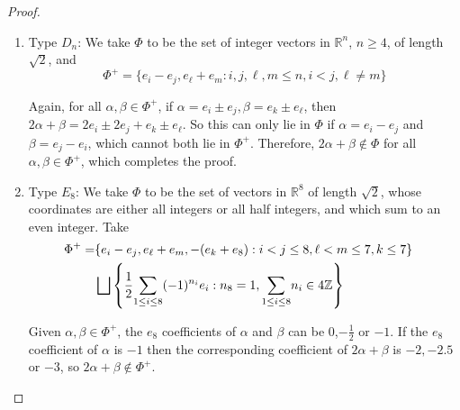 \documentclass[12pt,a4paper]{article}
\let\\=\cr
\theoremstyle{definition}
\theoremstyle{remark}
\theoremstyle{custthm}
\begin{document}
\begin{proof}
\begin{enumerate}
    If $\Psi$ contains a root of the form $\gamma=e_i-e_j$ with $i<j$, then if $j<n$, take $\alpha=e_j+e_n$ and $\alpha+\gamma=e_i-e_n\in\Phi^+$, and if $j=n$ then take $\alpha=e_\ell+e_n$ for some $i\neq\ell<n$ (which we know exists since $n>2$), and $\alpha+\gamma=e_i+e_\ell\in\Phi^+$. In either case, since $2\alpha+\beta\notin\Phi$, for all $\beta\in\Psi$, the result follows. 
    
    Therefore, we may assume that $\Psi$ does not contain a root of the form $e_i-e_j$, so every root in $\Psi$ has the form $e_k$ or $e_\ell+e_m$. Therefore, if $\alpha=e_k$ then $2\alpha+\beta$ has $e_k$ coefficient at least 2 for every $\beta\in\Psi$, so $2\alpha+\beta\notin\Phi$. So $2\alpha+\beta\notin\Phi$ for all $\alpha\in\Phi^+$, $\beta\in\Psi$, which completes the proof by the argument outlined above.\\

    \item Type $D_n$: We take $\Phi$ to be the set of integer vectors in $\mathbb{R}^n$, $n\geq 4$, of length $\sqrt{2}$, and $$\Phi^+=\{e_i-e_j,e_\ell+e_m:i,j,\ell,m\leq n,i<j,\ell\neq m\}$$

    Again, for all $\alpha,\beta\in\Phi^+$, if $\alpha=e_i\pm e_j,\beta=e_k\pm e_\ell$, then $2\alpha+\beta=2e_i\pm 2e_j+e_k\pm e_\ell$. So this can only lie in $\Phi$ if $\alpha=e_i-e_j$ and $\beta=e_j-e_i$, which cannot both lie in $\Phi^+$. Therefore, $2\alpha+\beta\notin\Phi$ for all $\alpha,\beta\in\Phi^+$, which completes the proof.\\

    \item Type $E_8$: We take $\Phi$ to be the set of vectors in $\mathbb{R}^8$ of length $\sqrt{2}$, whose coordinates are either all integers or all half integers, and which sum to an even integer. Take
    \begin{align*}
        \Phi^+=&\{e_i-e_j,e_\ell+e_m,-(e_k+e_8):i<j\leq 8,\ell<m\leq 7,k\leq 7\}\\&\bigsqcup\left\{\frac{1}{2}\underset{1\leq i\leq 8}{\sum}(-1)^{n_i}e_i:n_8=1,\underset{1\leq i\leq 8}{\sum}n_i\in 4\mathbb{Z}\right\}
    \end{align*}

    Given $\alpha,\beta\in\Phi^+$, the $e_8$ coefficients of $\alpha$ and $\beta$ can be 0,$-\frac{1}{2}$ or $-1$. If the $e_8$ coefficient of $\alpha$ is $-1$ then the corresponding coefficient of $2\alpha+\beta$ is $-2,-2.5$ or $-3$, so $2\alpha+\beta\notin\Phi^+$. \\
    

\end{enumerate}
\end{proof}
\end{document}
